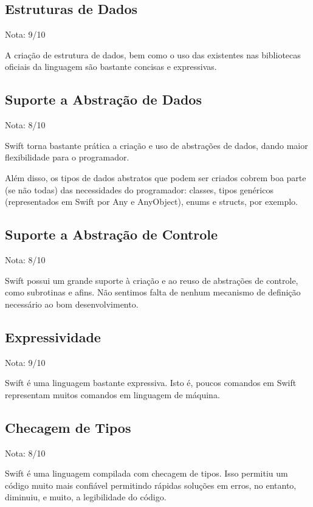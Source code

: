 \documentclass[rel_mlp]{iiufrgs}
\begin{document}
\subsection{Estruturas de Dados}

Nota: 9/10

A criação de estrutura de dados, bem como o uso das existentes nas bibliotecas oficiais da linguagem são bastante concisas e expressivas.

\subsection{Suporte a Abstração de Dados}

Nota: 8/10

Swift torna bastante prática a criação e uso de abstrações de dados, dando maior flexibilidade para o programador.

Além disso, os tipos de dados abstratos que podem ser criados cobrem boa parte (se não todas) das necessidades do programador: classes, tipos genéricos (representados em Swift por Any e AnyObject), enums e structs, por exemplo.

\subsection{Suporte a Abstração de Controle}

Nota: 8/10

Swift possui um grande suporte à criação e ao reuso de abstrações de controle, como subrotinas e afins. Não sentimos falta de nenhum mecanismo de definição necessário ao bom desenvolvimento.

\subsection{Expressividade}

Nota: 9/10

Swift é uma linguagem bastante expressiva. Isto é, poucos comandos em Swift representam muitos comandos em linguagem de máquina.

\subsection{Checagem de Tipos}

Nota: 8/10

Swift é uma linguagem compilada com checagem de tipos. Isso permitiu um código muito mais confiável permitindo rápidas soluções em erros, no entanto, diminuiu, e muito, a legibilidade do código.
\end{document}
